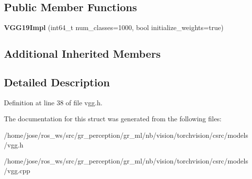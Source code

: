 \subsection*{Public Member Functions}
\begin{DoxyCompactItemize}
\item 
\mbox{\label{structvision_1_1models_1_1VGG19Impl_a23b8c538948c2cecfdf6cb4941c9dd7a}} 
{\bfseries V\+G\+G19\+Impl} (int64\+\_\+t num\+\_\+classes=1000, bool initialize\+\_\+weights=true)
\end{DoxyCompactItemize}
\subsection*{Additional Inherited Members}


\subsection{Detailed Description}


Definition at line 38 of file vgg.\+h.



The documentation for this struct was generated from the following files\+:\begin{DoxyCompactItemize}
\item 
/home/jose/ros\+\_\+ws/src/gr\+\_\+perception/gr\+\_\+ml/nb/vision/torchvision/csrc/models/vgg.\+h\item 
/home/jose/ros\+\_\+ws/src/gr\+\_\+perception/gr\+\_\+ml/nb/vision/torchvision/csrc/models/vgg.\+cpp\end{DoxyCompactItemize}
